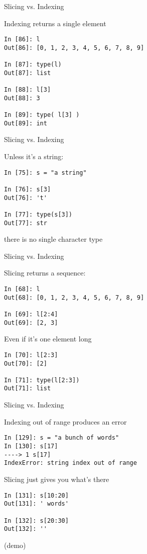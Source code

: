 \documentclass{beamer}
\begin{document}
\begin{frame}[fragile]{Slicing vs. Indexing}

Indexing returns a single element

\begin{verbatim}
In [86]: l
Out[86]: [0, 1, 2, 3, 4, 5, 6, 7, 8, 9]

In [87]: type(l)
Out[87]: list

In [88]: l[3]
Out[88]: 3

In [89]: type( l[3] )
Out[89]: int
\end{verbatim}
\end{frame}

\begin{frame}[fragile]{Slicing vs. Indexing}

Unless it's a string:

\begin{verbatim}
In [75]: s = "a string"

In [76]: s[3]
Out[76]: 't'

In [77]: type(s[3])
Out[77]: str
\end{verbatim}

there is no single character type

\end{frame}


\begin{frame}[fragile]{Slicing vs. Indexing}

Slicing returns a sequence:

\begin{verbatim}
In [68]: l
Out[68]: [0, 1, 2, 3, 4, 5, 6, 7, 8, 9]

In [69]: l[2:4]
Out[69]: [2, 3]
\end{verbatim}

Even if it's one element long

\begin{verbatim}
In [70]: l[2:3]
Out[70]: [2]

In [71]: type(l[2:3])
Out[71]: list
\end{verbatim}

\end{frame}

\begin{frame}[fragile]{Slicing vs. Indexing}

{\Large Indexing out of range produces an error}
\vfill
\begin{verbatim}
In [129]: s = "a bunch of words"
In [130]: s[17]
----> 1 s[17]
IndexError: string index out of range
\end{verbatim}

\vfill
{\Large Slicing just gives you what's there}

\begin{verbatim}
In [131]: s[10:20]
Out[131]: ' words'

In [132]: s[20:30]
Out[132]: ''
\end{verbatim}
(demo)
\end{frame}
\end{document}
